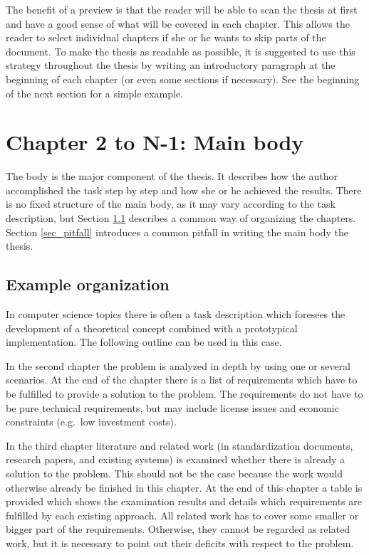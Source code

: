 The benefit of a preview is that the reader will be able to scan the thesis at first and have a good sense of what will be covered in each chapter. This allows the reader to select individual chapters if she or he wants to skip parts of the document. To make the thesis as readable as possible, it is suggested to use this strategy throughout the thesis by writing an introductory paragraph at the beginning of each chapter (or even some sections if necessary). See the beginning of the next section for a simple example.
  
\section{Chapter 2 to N-1: Main body} 

The body is the major component of the thesis. It describes how the author accomplished the task step by step and how she or he achieved the results. There is no fixed structure of the main body, as it may vary according to the task description, but Section \ref{sec_examplestructure} describes a common way of organizing the chapters. Section \ref{sec_pitfall} introduces a common pitfall in writing the main body the thesis.

\subsection{Example organization} \label{sec_examplestructure}

In computer science topics there is often a task description which foresees the development of a theoretical concept combined with a prototypical implementation. The following outline can be used in this case.

In the second chapter the problem is analyzed in depth by using one or several scenarios. At the end of the chapter there is a list of requirements which have to be fulfilled to provide a solution to the problem. The requirements do not have to be pure technical requirements, but may include license issues and economic constraints (e.g.~low investment costs).

In the third chapter literature and related work (in standardization documents, research papers, and existing systems) is examined whether there is already a solution to the problem. This should not be the case because the work would otherwise already be finished in this chapter. At the end of this chapter a table is provided which shows the examination results and details which requirements are fulfilled by each existing approach. All related work has to cover some smaller or bigger part of the requirements. Otherwise, they cannot be regarded as related work, but it is necessary to point out their deficits with respect to the problem.

